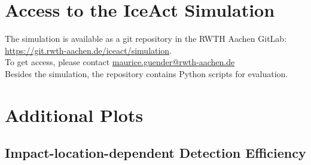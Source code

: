 \chapter{Access to the IceAct \geant Simulation}

The \iceact \geant simulation is available as a git repository in the RWTH Aachen \mbox{GitLab}:\\

\url{https://git.rwth-aachen.de/iceact/simulation}.\\

To get access, please contact \href{mailto:maurice.guender@rwth-aachen.de}{maurice.guender@rwth-aachen.de}\\

Besides the \geant simulation, the repository contains Python scripts for evaluation.

\chapter{Additional Plots}

\section{Impact-location-dependent Detection Efficiency}\label{appendix:alienplots}

